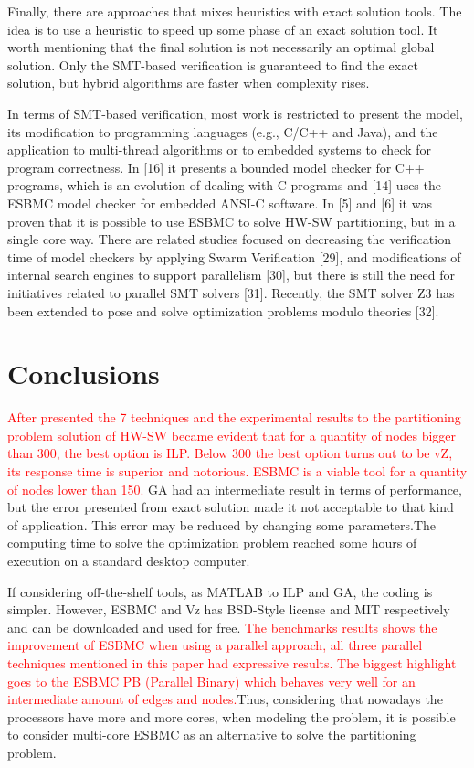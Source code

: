 Finally, there are approaches that mixes heuristics with exact solution tools. The idea is to use a heuristic to speed up some phase of an exact solution tool. It worth mentioning that the final solution is not necessarily an optimal global solution. Only the SMT-based verification is guaranteed to find the exact solution, but hybrid algorithms are faster when complexity rises.

In terms of SMT-based verification, most work is restricted to present the model, its modification to programming languages (e.g., C/C++ and Java), and the application to multi-thread algorithms or to embedded systems to check for program correctness. In [16] it presents a bounded model checker for C++ programs, which is an evolution of dealing with C programs and [14] uses the ESBMC model checker for embedded ANSI-C software. In [5] and [6] it was proven that it is possible to use ESBMC to solve HW-SW partitioning, but in a single core way. There are related studies focused on decreasing the verification time of model checkers by applying Swarm Verification [29], and modifications of internal search engines to support parallelism [30], but there is still the need for initiatives related to parallel SMT solvers [31]. Recently, the SMT solver Z3 has been extended to pose and solve optimization problems modulo theories [32].

\section{Conclusions}

\textcolor{Red}{After presented the 7 techniques and the experimental results to the partitioning problem solution of HW-SW became evident that for a quantity of nodes bigger than 300, the best option is ILP. Below 300 the best option turns out to be vZ, its response time is superior and notorious. ESBMC is a viable tool for a quantity of nodes lower than 150.}  GA had an intermediate result in terms of performance, but the error presented from exact solution made it not acceptable to that kind of application. This error may be reduced by changing some parameters.The computing time to solve the optimization problem reached some hours of execution on a standard desktop computer. 

If considering off-the-shelf tools, as MATLAB to ILP and GA, the coding is simpler. However, ESBMC and Vz has BSD-Style license and MIT respectively and can be downloaded and used for free.\textcolor{Red}{ The benchmarks results shows the improvement of ESBMC when using a parallel approach, all three parallel techniques mentioned in this paper had expressive results. The biggest highlight goes to the ESBMC PB (Parallel Binary) which behaves very well for an intermediate amount of edges and nodes.}Thus, considering that nowadays the processors have more and more cores, when modeling the problem, it is possible to consider multi-core ESBMC as an alternative to solve the partitioning problem. 


